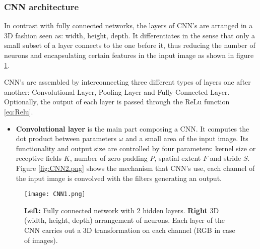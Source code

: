 \subsubsection{CNN architecture}
In contrast with fully connected networks, the layers of CNN's are arranged in a 3D fashion seen as: width, height, depth. It differentiates in the sense that only a small subset of a layer connects to the one before it, thus reducing the number of neurons and encapsulating certain features in the input image as shown in  figure \ref{fig:CNNim1}. \

CNN's are assembled by interconnecting three different types of layers one after another: Convolutional Layer, Pooling Layer and Fully-Connected Layer. Optionally, the output of each layer is passed through the ReLu function \ref{eq:Relu}. 
\begin{itemize}
\item \textbf{Convolutional layer} is the main part composing a CNN. It computes the dot product between parameters $\omega$ and a small area of the input image. Its  functionality and output size are controlled by four parameters: kernel size or receptive fields $K$, number of zero padding $P$, spatial extent $F$ and stride $S$. Figure \ref{fig:CNN2.png} shows the mechanism that  CNN's use, each channel of the input image is convolved with the filters generating an output.  
\end{itemize}
\begin{figure}[tb] 
\centering 
\texttt{[image: CNN1.png]} 
\caption[Fully connected network VS CNN]{\textbf{Left:} Fully connected network with 2 hidden layers. \textbf{Right} 3D (width, height, depth) arrangement of neurons. Each layer of the CNN carries out a 3D transformation on each channel (RGB in case of images). }
\label{fig:CNNim1} 
\end{figure}

